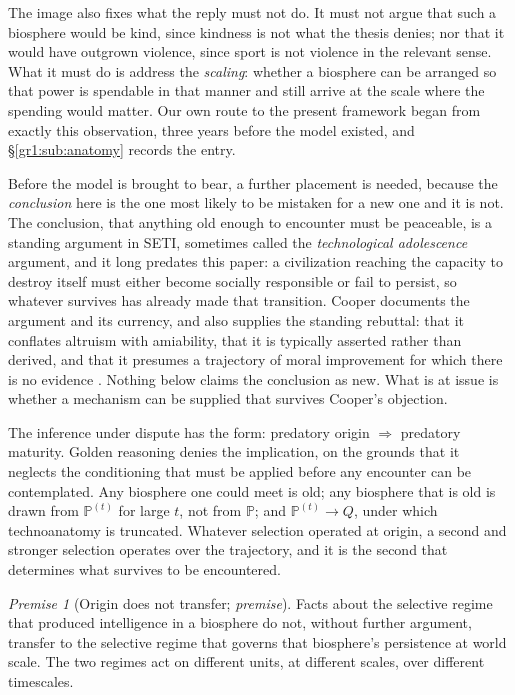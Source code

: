 \documentclass[11pt]{article}
\numberwithin{equation}{section}
\theoremstyle{plain}
\theoremstyle{definition}
\theoremstyle{remark}
\newcommand{\PP}{\mathbb{P}}
\newtheorem{premise}{Premise}
\begin{document}
The image also fixes what the reply must not do. It must not argue that
such a biosphere would be kind, since kindness is not what the thesis
denies; nor that it would have outgrown violence, since sport is not
violence in the relevant sense. What it must do is address the
\emph{scaling}: whether a biosphere can be arranged so that power is
spendable in that manner and still arrive at the scale where the
spending would matter. Our own route to the present framework
began from exactly this observation, three years before the model
existed, and \S\ref{gr1:sub:anatomy} records the entry.

Before the model is brought to bear, a further placement is needed, because the \emph{conclusion} here is the one most likely to be mistaken
for a new one and it is not. The conclusion, that anything old enough to encounter must be
peaceable, is a standing argument in SETI, sometimes called the
\emph{technological adolescence} argument, and it long predates this
paper: a civilization reaching the capacity to destroy itself must
either become socially responsible or fail to persist, so whatever
survives has already made that transition. Cooper documents the
argument and its currency, and also supplies the standing rebuttal: that
it conflates altruism with amiability, that it is typically asserted
rather than derived, and that it presumes a trajectory of moral
improvement for which there is no evidence \cite{Cooper19}. Nothing
below claims the conclusion as new. What is at issue is whether a
mechanism can be supplied that survives Cooper's objection.

The inference under dispute has the form: predatory origin
$\Rightarrow$ predatory maturity. Golden reasoning denies the
implication, on the grounds that it neglects the conditioning that must
be applied before any encounter can be contemplated. Any biosphere one could meet is old; any biosphere
that is old is drawn from $\PP^{(t)}$ for large $t$, not from $\PP$; and
$\PP^{(t)}\to Q$, under which technoanatomy is truncated. Whatever
selection operated at origin, a second and stronger selection operates
over the trajectory, and it is the second that determines what survives
to be encountered.

\setcounter{premise}{3} %
\begin{premise}[Origin does not transfer; \emph{premise}]
\label{gr:phi4}
Facts about the selective regime that produced intelligence in a
biosphere do not, without further argument, transfer to the selective
regime that governs that biosphere's persistence at world scale. The two
regimes act on different units, at different scales, over different
timescales.
\end{premise}
\end{document}
